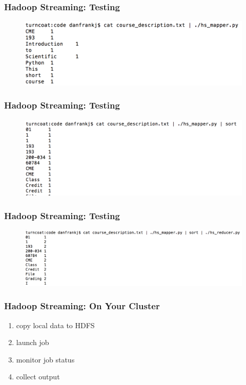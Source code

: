 \documentclass{beamer}
\begin{document}
\begin{frame}
\frametitle{Hadoop Streaming: Testing}
\begin{figure}[h]
\centering
\includegraphics[width=.95\textwidth]{images/local1.png}
\end{figure}
\end{frame}

\begin{frame}
\frametitle{Hadoop Streaming: Testing}
\begin{figure}[h]
\centering
\includegraphics[width=.95\textwidth]{images/local2.png}
\end{figure}
\end{frame}

\begin{frame}
\frametitle{Hadoop Streaming: Testing}
\begin{figure}[h]
\centering
\includegraphics[width=.95\textwidth]{images/local3.png}
\end{figure}
\end{frame}

\begin{frame}
\frametitle{Hadoop Streaming: On Your Cluster}
\begin{enumerate}
\item copy local data to HDFS
\item launch job
\item monitor job status
\item collect output
\end{enumerate}
\end{frame}
\end{document}
